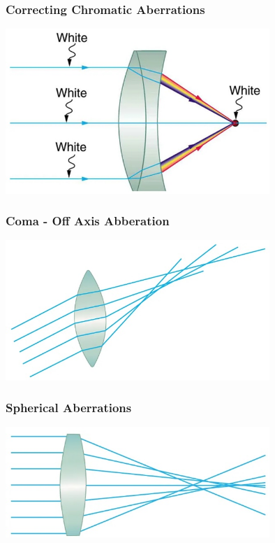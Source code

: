 \documentclass{beamer}
\begin{document}
\begin{frame}\frametitle{Correcting Chromatic Aberrations}

\begin{center}
\includegraphics[width=10cm]{fig/chromeAbb2.jpg}
\end{center}

\end{frame}

\begin{frame}\frametitle{Coma - Off Axis Abberation}

\begin{center}
\includegraphics[width=10cm]{fig/coma.jpg}
\end{center}

\end{frame}

\begin{frame}\frametitle{Spherical Aberrations}

\begin{center}
\includegraphics[width=10cm]{fig/sphereAbb.jpg}
\end{center}

\end{frame}
\end{document}
